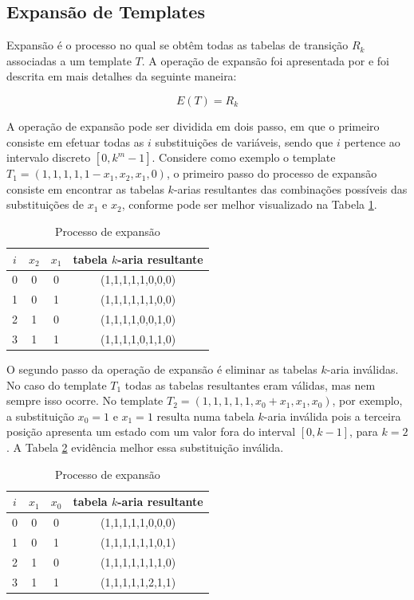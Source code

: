 \documentclass[12pt,a4paper]{article}
\begin{document}
\newpage\newpage
\subsection{Expansão de Templates}
	Expansão é o processo no qual se obtêm todas as tabelas de transição $R_k$ associadas a um template $T$.
	A operação de expansão foi apresentada por  e foi descrita em mais detalhes da seguinte maneira:

	\begin{equation}
	E(T)=R_k
	\end{equation}

	A operação de expansão pode ser dividida em dois passo, em que o primeiro consiste em efetuar todas as $i$ substituições de variáveis, sendo que $i$ pertence ao intervalo discreto $[0,k^m-1]$. Considere como exemplo o template $T_1 = (1,1,1,1,1-x_1,x_2,x_1,0)$, o primeiro passo do processo de expansão consiste em encontrar as tabelas $k$-arias resultantes das combinações possíveis das substituições de $x_1$ e $x_2$, conforme pode ser melhor visualizado na Tabela \ref{tab:expansionProcess}.

	\begin{table}[h!]
	\centering
	\caption{Processo de expansão}
	{
		\vspace{0.3cm}
		\begin{tabular}{cccc}
		\hline
		$i$ & $x_2$ & $x_1$ & tabela $k$-aria resultante \\
		\hline
		0	&	0	&	0	&	(1,1,1,1,1,0,0,0)	\\
		1	&	0	&	1	&	(1,1,1,1,1,1,0,0)	\\
		2	&	1	&	0	&	(1,1,1,1,0,0,1,0)	\\
		3	&	1	&	1	&	(1,1,1,1,0,1,1,0)	\\
		\hline
		\end{tabular}
	}
	\label{tab:expansionProcess}
	\end{table}

	O segundo passo da operação de expansão é eliminar as tabelas $k$-aria inválidas. No caso do template $T_1$ todas as tabelas resultantes eram válidas, mas nem sempre isso ocorre. No template $T_2 = (1,1,1,1,1,x_0+x_1,x_1,x_0)$, por exemplo, a substituição $x_0 = 1$ e $x_1 = 1$ resulta numa tabela $k$-aria inválida pois a terceira posição apresenta um estado com um valor fora do interval $[0,k-1]$, para $k=2$. A Tabela \ref{tab:invalideExpansion} evidência melhor essa substituição inválida.

	\begin{table}[h!]
	\centering
	\caption{Processo de expansão}
	{
		\vspace{0.3cm}
		\begin{tabular}{cccc}
		\hline
		$i$ & $x_1$ & $x_0$ & tabela $k$-aria resultante \\
		\hline
		0	&	0	&	0	&	(1,1,1,1,1,0,0,0)	\\
		1	&	0	&	1	&	(1,1,1,1,1,1,0,1)	\\
		2	&	1	&	0	&	(1,1,1,1,1,1,1,0)	\\
		3	&	1	&	1	&	(1,1,1,1,1,2,1,1)	\\
		\hline
		\end{tabular}
	}
	\label{tab:invalideExpansion}
	\end{table}
\end{document}
